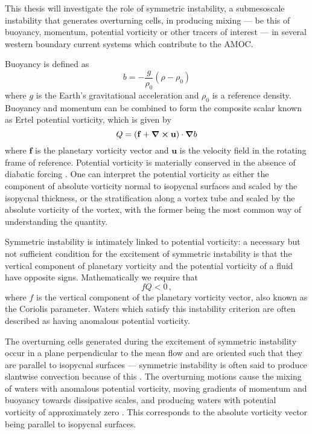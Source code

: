 This thesis will investigate the role of symmetric instability, a submesoscale instability that generates overturning cells, in producing mixing --- be this of buoyancy, momentum, potential vorticity or other tracers of interest --- in several western boundary current systems which contribute to the AMOC.

Buoyancy is defined as
\begin{equation}
    b = -\frac{g}{\rho_{0}}(\rho - \rho_{0})
\end{equation}
where $g$ is the Earth's gravitational acceleration and $\rho_{0}$ is a reference density. Buoyancy and momentum can be combined to form the composite scalar known as Ertel potential vorticity, which is given by
\begin{equation}
    \label{eq:EPV}
    Q = (\mathbf{f} + \curl{\mathbf{u}}) \cdot \grad{b}
\end{equation}
where $\mathbf{f}$ is the planetary vorticity vector and $\mathbf{u}$ is the velocity field in the rotating frame of reference. Potential vorticity is materially conserved in the absence of diabatic forcing \citep{Ertel1942}. One can interpret the potential vorticity as either the component of absolute vorticity normal to isopycnal surfaces and scaled by the isopycnal thickness, or the stratification along a vortex tube and scaled by the absolute vorticity of the vortex, with the former being the most common way of understanding the quantity.

Symmetric instability is intimately linked to potential vorticity: a necessary but not sufficient condition for the excitement of symmetric instability is that the vertical component of planetary vorticity and the potential vorticity of a fluid have opposite signs. Mathematically we require that
\begin{equation}
    \label{eq:PVSI1}
    f Q < 0 \, ,
\end{equation}
where $f$ is the vertical component of the planetary vorticity vector, also known as the Coriolis parameter\footnotemark. Waters which satisfy this instability criterion are often described as having anomalous potential vorticity.

The overturning cells generated during the excitement of symmetric instability occur in a plane perpendicular to the mean flow and are oriented such that they are parallel to isopycnal surfaces --- symmetric instability is often said to produce slantwise convection because of this \citep[e.g.][]{emanuelSlantwiseConvection1994}. The overturning motions cause the mixing of waters with anomalous potential vorticity, moving gradients of momentum and buoyancy towards dissipative scales, and producing waters with potential vorticity of approximately zero \citep{Taylor2009}. This corresponds to the absolute vorticity vector being parallel to isopycnal surfaces.

